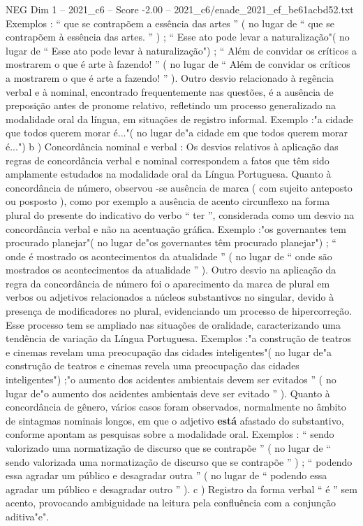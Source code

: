 \begin{textsample}{NEG Dim 1 – 2021\_c6 – Score -2.00 – 2021\_c6/enade\_2021\_ef\_be61acbd52.txt}
Exemplos : “ que se contrapõem a essência das artes ” ( no lugar de “ que se contrapõem à essência das artes. ” ) ; “ Esse ato pode levar a naturalização"( no lugar de “ Esse ato pode levar à naturalização") ; “ Além de convidar os críticos a mostrarem o que é arte à fazendo! ” ( no lugar de “ Além de convidar os críticos a mostrarem o que é arte a fazendo! ” ).
Outro desvio relacionado à regência verbal e à nominal, encontrado frequentemente nas questões, é a ausência de preposição antes de pronome relativo, refletindo um processo generalizado na modalidade oral da língua, em situações de registro informal.
Exemplo :"a cidade que todos querem morar é..."( no lugar de"a cidade em que todos querem morar é...") b ) Concordância nominal e verbal : Os desvios relativos à aplicação das regras de concordância verbal e nominal correspondem a fatos que têm sido amplamente estudados na modalidade oral da Língua Portuguesa.
Quanto à concordância de número, observou -se ausência de marca ( com sujeito anteposto ou posposto ), como por exemplo a ausência de acento circunflexo na forma plural do presente do indicativo do verbo “ ter ”, considerada como um desvio na concordância verbal e não na acentuação gráfica.
Exemplo :"os governantes tem procurado planejar"( no lugar de"os governantes têm procurado planejar") ; “ onde é mostrado os acontecimentos da atualidade ” ( no lugar de “ onde são mostrados os acontecimentos da atualidade ” ).
Outro desvio na aplicação da regra da concordância de número foi o aparecimento da marca de plural em verbos ou adjetivos relacionados a núcleos substantivos no singular, devido à presença de modificadores no plural, evidenciando um processo de hipercorreção.
Esse processo tem se ampliado nas situações de oralidade, caracterizando uma tendência de variação da Língua Portuguesa.
Exemplos :"a construção de teatros e cinemas revelam uma preocupação das cidades inteligentes"( no lugar de"a construção de teatros e cinemas revela uma preocupação das cidades inteligentes") ;"o aumento dos acidentes ambientais devem ser evitados ” ( no lugar de"o aumento dos acidentes ambientais deve ser evitado ” ).
Quanto à concordância de gênero, vários casos foram observados, normalmente no âmbito de sintagmas nominais longos, em que o adjetivo \textbf{está} afastado do substantivo, conforme apontam as pesquisas sobre a modalidade oral.
Exemplos : “ sendo valorizado uma normatização de discurso que se contrapõe ” ( no lugar de “ sendo valorizada uma normatização de discurso que se contrapõe ” ) ; “ podendo essa agradar um público e desagradar outra ” ( no lugar de “ podendo essa agradar um público e desagradar outro ” ). c ) Registro da forma verbal “ é ” sem acento, provocando ambiguidade na leitura pela confluência com a conjunção aditiva"e".

\end{textsample}
